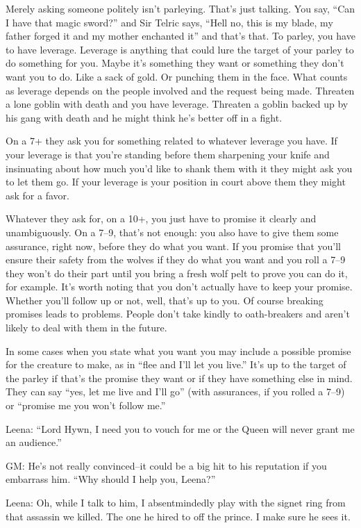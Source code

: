 Merely asking someone politely isn't parleying. That's just talking. You say, ``Can I have that magic sword?'' and Sir Telric says, ``Hell no, this is my blade, my father forged it and my mother enchanted it'' and that's that. To parley, you have to have leverage. Leverage is anything that could lure the target of your parley to do something for you. Maybe it's something they want or something they don't want you to do. Like a sack of gold. Or punching them in the face. What counts as leverage depends on the people involved and the request being made. Threaten a lone goblin with death and you have leverage. Threaten a goblin backed up by his gang with death and he might think he's better off in a fight.


 On a 7+ they ask you for something related to whatever leverage you have. If your leverage is that you're standing before them sharpening your knife and insinuating about how much you'd like to shank them with it they might ask you to let them go. If your leverage is your position in court above them they might ask for a favor.


 Whatever they ask for, on a 10+, you just have to promise it clearly and unambiguously. On a 7--9, that's not enough: you also have to give them some assurance, right now, before they do what you want. If you promise that you'll ensure their safety from the wolves if they do what you want and you roll a 7--9 they won't do their part until you bring a fresh wolf pelt to prove you can do it, for example. It's worth noting that you don't actually have to keep your promise. Whether you'll follow up or not, well, that's up to you. Of course breaking promises leads to problems. People don't take kindly to oath-breakers and aren't likely to deal with them in the future.


 In some cases when you state what you want you may include a possible promise for the creature to make, as in ``flee and I'll let you live.'' It's up to the target of the parley if that's the promise they want or if they have something else in mind. They can say ``yes, let me live and I'll go'' (with assurances, if you rolled a 7--9) or ``promise me you won't follow me.''


 Leena: ``Lord Hywn, I need you to vouch for me or the Queen will never grant me an audience.''


 GM: He's not really convinced--it could be a big hit to his reputation if you embarrass him. ``Why should I help you, Leena?''


 Leena: Oh, while I talk to him, I absentmindedly play with the signet ring from that assassin we killed. The one he hired to off the prince. I make sure he sees it.


